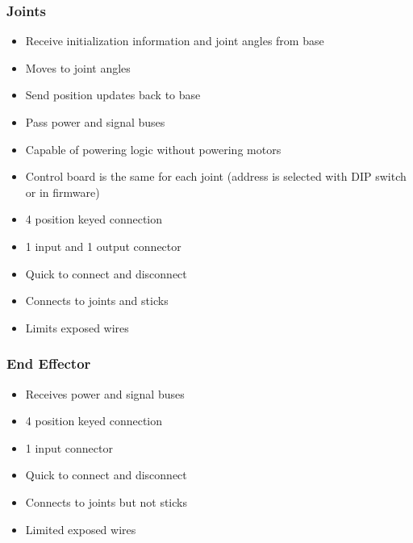 \subsubsection{Joints}
\begin{itemize}
	\item Receive initialization information and joint angles from base
	\item Moves to joint angles
	\item Send position updates back to base
	\item Pass power and signal buses
	\item Capable of powering logic without powering motors
	\item Control board is the same for each joint (address is selected with DIP switch or in firmware)
	\item 4 position keyed connection
	\item 1 input and 1 output connector
	\item Quick to connect and disconnect
	\item Connects to joints and sticks
	\item Limits exposed wires
\end{itemize}

\subsubsection{End Effector}
\begin{itemize}
	\item Receives power and signal buses
	\item 4 position keyed connection
	\item 1 input connector
	\item Quick to connect and disconnect
	\item Connects to joints but not sticks
	\item Limited exposed wires
\end{itemize}

